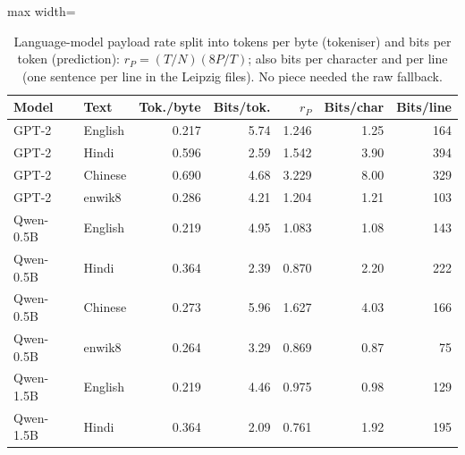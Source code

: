 \begin{table}[t]\centering\caption{Language-model payload rate split into tokens per byte (tokeniser) and bits per token (prediction): $r_P=(T/N)(8P/T)$; also bits per character and per line (one sentence per line in the Leipzig files). No piece needed the raw fallback.}\label{tab:tok}\footnotesize\setlength{\tabcolsep}{3.5pt}
\begin{adjustbox}{max width=\columnwidth}\begin{tabular}{@{}llrrrrr@{}}\toprule
Model & Text & Tok./byte & Bits/tok. & $r_P$ & Bits/char & Bits/line\\\midrule
GPT-2 & English & 0.217 & 5.74 & 1.246 & 1.25 & 164\\
GPT-2 & Hindi & 0.596 & 2.59 & 1.542 & 3.90 & 394\\
GPT-2 & Chinese & 0.690 & 4.68 & 3.229 & 8.00 & 329\\
GPT-2 & enwik8 & 0.286 & 4.21 & 1.204 & 1.21 & 103\\
\midrule
Qwen-0.5B & English & 0.219 & 4.95 & 1.083 & 1.08 & 143\\
Qwen-0.5B & Hindi & 0.364 & 2.39 & 0.870 & 2.20 & 222\\
Qwen-0.5B & Chinese & 0.273 & 5.96 & 1.627 & 4.03 & 166\\
Qwen-0.5B & enwik8 & 0.264 & 3.29 & 0.869 & 0.87 & 75\\
\midrule
Qwen-1.5B & English & 0.219 & 4.46 & 0.975 & 0.98 & 129\\
Qwen-1.5B & Hindi & 0.364 & 2.09 & 0.761 & 1.92 & 195\\
\bottomrule\end{tabular}\end{adjustbox}\end{table}